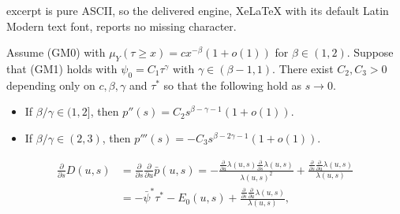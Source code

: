 \documentclass[10pt,a4paper]{amsart}
\def\ge{\geqslant}
\begin{document}
excerpt is pure ASCII, so the delivered engine, XeLaTeX with its default Latin Modern text font, reports no missing character.
\begin{prop}\label{prop:gmsec} Assume (GM0) with $\mu_Y(\tau\ge x)=c x^{-\beta}(1+o(1))$ for $\beta\in (1,2)$.
Suppose that (GM1) holds with $\psi_0=C_1 \tau^\gamma$ with $\gamma\in (\beta-1,1)$. 
There exist $C_2, C_3>0$ depending only on $c,\beta,\gamma$ and $\tau^*$ so that the following hold as $s\to 0$.
\begin{itemize}
\item[(i)] If $\beta/\gamma\in (1,2]$, then $p''(s)=C_2 s^{\beta-\gamma-1}(1+o(1))$.
\item[(ii)] If $\beta/\gamma\in (2, 3)$, then $p'''(s)=-C_3 s^{\beta-2\gamma-1}(1+o(1))$.
\end{itemize}
\end{prop}

 \begin{align}\label{eq:dounderpbar}
  \frac{\partial}{\partial s} D(u,s)&=\frac{\partial}{\partial s}\frac{\partial}{\partial u}\bar p(u,s)
  =  -\frac{\frac{\partial}{\partial u}\lambda(u,s)\frac{\partial}{\partial s}\lambda(u,s)}{\lambda(u,s)^2}+\frac{\frac{\partial}{\partial s}\frac{\partial}{\partial u}\lambda(u,s)}{\lambda(u,s)}\\
 \nonumber &=-\bar\psi^*\tau^*-E_0(u,s)+\frac{\frac{\partial}{\partial s}\frac{\partial}{\partial u}\lambda(u,s)}{\lambda(u,s)},
 \end{align}
\end{document}
